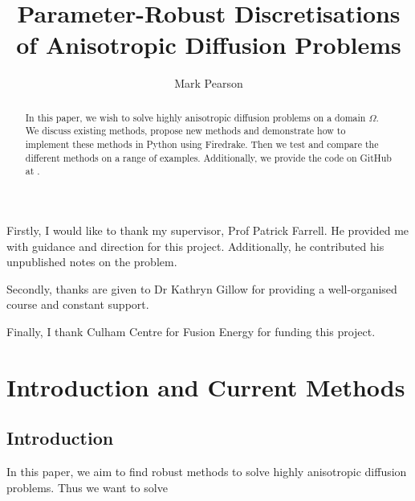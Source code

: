 \documentclass[12pt]{ociamthesis}
\title{Parameter-Robust Discretisations of Anisotropic 
Diffusion Problems}
\author{Mark Pearson}
\begin{document}
\maketitle

\thispagestyle{empty}

\newpage

\begin{acknowledgements} 

Firstly, I would like to thank my supervisor, Prof Patrick Farrell. He provided me with guidance and direction for this project. Additionally, he contributed his unpublished notes on the problem.

Secondly, thanks are given to Dr Kathryn Gillow for providing a well-organised course and constant support.

Finally, I thank Culham Centre for Fusion Energy for funding this project. 

\end{acknowledgements}

\newpage

\begin{abstract}
In this paper, we wish to solve highly anisotropic diffusion problems on a domain $\Omega$. We discuss existing methods, propose new methods and demonstrate how to implement these methods in Python using Firedrake. Then we test and compare the different methods on a range of examples. Additionally, we provide the code on GitHub at \cite{Hub}.
\end{abstract}

\newpage
\setcounter{page}{1}

\tableofcontents


\chapter{Introduction and Current Methods}
\section{Introduction}
In this paper, we aim to find robust methods to solve highly anisotropic diffusion problems. Thus we want to solve
\end{document}
